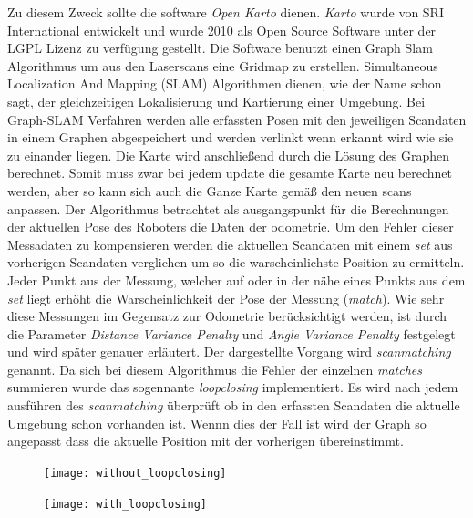 Zu diesem Zweck sollte die software \emph{Open Karto} dienen. \emph{Karto} wurde von SRI International entwickelt und wurde 2010 als Open Source Software unter der \Gls{LGPL} Lizenz zu verfügung gestellt. Die Software benutzt einen Graph Slam Algorithmus um aus den Laserscans eine Gridmap zu erstellen. Simultaneous Localization And Mapping (SLAM) Algorithmen dienen, wie der Name schon sagt, der gleichzeitigen Lokalisierung und Kartierung einer Umgebung. Bei Graph-SLAM Verfahren werden alle erfassten Posen mit den jeweiligen Scandaten in einem Graphen abgespeichert und werden verlinkt wenn erkannt wird wie sie zu einander liegen. 
Die Karte wird anschließend durch die Lösung des Graphen berechnet. Somit muss zwar bei jedem update die gesamte Karte neu berechnet werden, aber so kann sich auch die Ganze Karte gemäß den neuen scans anpassen.
Der Algorithmus betrachtet als ausgangspunkt für die Berechnungen der aktuellen Pose des Roboters die Daten der \Gls{odometrie}. Um den Fehler dieser Messadaten zu kompensieren werden die aktuellen Scandaten mit einem \emph{set} aus vorherigen Scandaten verglichen um so die warscheinlichste Position zu ermitteln. Jeder Punkt aus der Messung, welcher auf oder in der nähe eines Punkts aus dem \emph{set} liegt erhöht die Warscheinlichkeit der Pose der Messung (\emph{match}). Wie sehr diese Messungen im Gegensatz zur Odometrie berücksichtigt werden, ist durch die Parameter \emph{Distance Variance Penalty} und \emph{Angle Variance Penalty} festgelegt und wird später genauer erläutert.
Der dargestellte Vorgang wird \emph{scanmatching} genannt.
Da sich bei diesem Algorithmus die Fehler der einzelnen \emph{matches} summieren wurde das sogennante \emph{loopclosing} implementiert. Es wird nach jedem ausführen des \emph{scanmatching} überprüft ob in den erfassten Scandaten die aktuelle Umgebung schon vorhanden ist. Wennn dies der Fall ist wird der Graph so angepasst dass die aktuelle Position mit der vorherigen übereinstimmt.

\FloatBarrier
\begin{figure}[]
  \centering
  \begin{minipage}[b]{0.4\textwidth}
    \texttt{[image: without\_loopclosing]}
  \end{minipage}
  \hspace{0.5cm}
  \begin{minipage}[b]{0.4\textwidth}
    \texttt{[image: with\_loopclosing]}
  \end{minipage}
\end{figure}
\FloatBarrier


